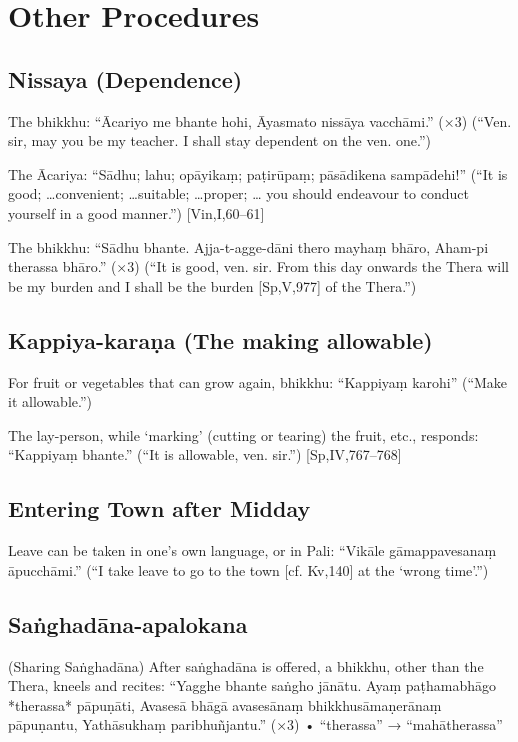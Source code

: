 \chapter{Other Procedures}

\section{Nissaya (Dependence)}

The bhikkhu:
“Ācariyo me bhante hohi,
Āyasmato nissāya vacchāmi.” (×3)
(“Ven. sir, may you be my teacher.
I shall stay dependent on the ven. one.”)

The Ācariya:
“Sādhu; lahu; opāyikaṃ; paṭirūpaṃ;
pāsādikena sampādehi!”
(“It is good; …convenient; …suitable; …proper; …
you should endeavour to conduct yourself in a good
manner.”)
[Vin,I,60–61]

The bhikkhu:
“Sādhu bhante.
Ajja-t-agge-dāni thero mayhaṃ bhāro,
Aham-pi therassa bhāro.” (×3)
(“It is good, ven. sir. From this day onwards the
Thera will be my burden and I shall be the burden
[Sp,V,977]
of the Thera.”)

\section{Kappiya-karaṇa (The making allowable)}

For fruit or vegetables that can grow again,
bhikkhu:
“Kappiyaṃ karohi”
(“Make it allowable.”)

The lay-person, while ‘marking’ (cutting or
tearing) the fruit, etc., responds:
“Kappiyaṃ bhante.”
(“It is allowable, ven. sir.”)
[Sp,IV,767–768]

\section{Entering Town after Midday}

Leave can be taken in one’s own language, or
in Pali:
“Vikāle gāmappavesanaṃ āpucchāmi.”
(“I take leave to go to the town
[cf. Kv,140]
at the ‘wrong time’.”)

\section{Saṅghadāna-apalokana}

(Sharing Saṅghadāna)
After saṅghadāna is offered, a bhikkhu, other
than the Thera, kneels and recites:
“Yagghe bhante saṅgho jānātu.
Ayaṃ paṭhamabhāgo *therassa* pāpuṇāti,
Avasesā bhāgā avasesānaṃ
bhikkhusāmaṇerānaṃ pāpuṇantu,
Yathāsukhaṃ paribhuñjantu.” (×3)
• “therassa” → “mahātherassa”

